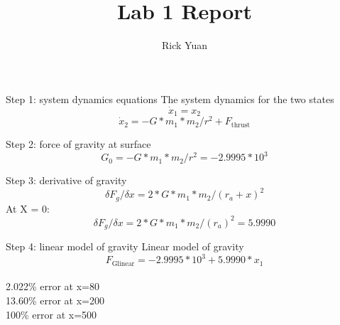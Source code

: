 \documentclass[11pt]{article}
\title{Lab 1 Report}
\author{Rick Yuan}
\begin{document}
\maketitle

Step 1: system dynamics equations
The system dynamics for the two states
\begin{equation}
	\dot{x}_1=x_2
\end{equation}
\begin{equation}
	\dot{x}_2=-G*m_1*m_2/r^2 + F_\mathrm{thrust}
\end{equation}

Step 2: force of gravity at surface
\begin{equation}
	G_0=-G*m_1*m_2/r^2=-2.9995*10^3
\end{equation}

Step 3: derivative of gravity
\begin{equation}
	\delta F_g/\delta x=2*G*m_1*m_2/(r_a +x)^2
\end{equation}
At X = 0:
\begin{equation}
	\delta F_g/\delta x=2*G*m_1*m_2/(r_a )^2 = 5.9990
\end{equation}

Step 4: linear model of gravity
Linear model of gravity
\begin{equation}
	F_\mathrm{Glinear} = -2.9995*10^3 + 5.9990*x_1
\end{equation}
\\
2.022\% error at x=80\\
13.60\% error at x=200\\
100\% error at x=500\\
\end{document}
